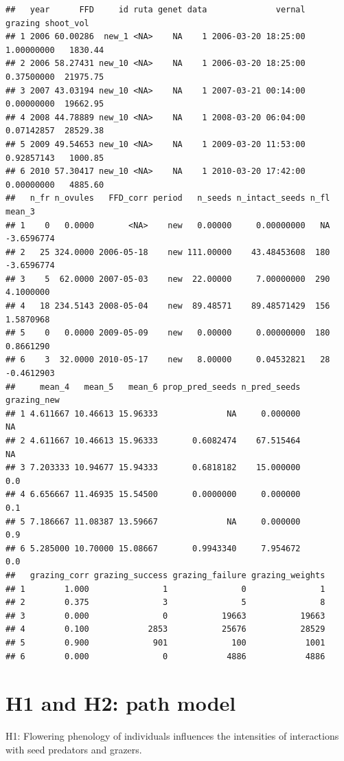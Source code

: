 \documentclass[
]{article}
\begin{document}
\begin{verbatim}
##   year      FFD     id ruta genet data              vernal    grazing shoot_vol
## 1 2006 60.00286  new_1 <NA>    NA    1 2006-03-20 18:25:00 1.00000000   1830.44
## 2 2006 58.27431 new_10 <NA>    NA    1 2006-03-20 18:25:00 0.37500000  21975.75
## 3 2007 43.03194 new_10 <NA>    NA    1 2007-03-21 00:14:00 0.00000000  19662.95
## 4 2008 44.78889 new_10 <NA>    NA    1 2008-03-20 06:04:00 0.07142857  28529.38
## 5 2009 49.54653 new_10 <NA>    NA    1 2009-03-20 11:53:00 0.92857143   1000.85
## 6 2010 57.30417 new_10 <NA>    NA    1 2010-03-20 17:42:00 0.00000000   4885.60
##   n_fr n_ovules   FFD_corr period   n_seeds n_intact_seeds n_fl     mean_3
## 1    0   0.0000       <NA>    new   0.00000     0.00000000   NA -3.6596774
## 2   25 324.0000 2006-05-18    new 111.00000    43.48453608  180 -3.6596774
## 3    5  62.0000 2007-05-03    new  22.00000     7.00000000  290  4.1000000
## 4   18 234.5143 2008-05-04    new  89.48571    89.48571429  156  1.5870968
## 5    0   0.0000 2009-05-09    new   0.00000     0.00000000  180  0.8661290
## 6    3  32.0000 2010-05-17    new   8.00000     0.04532821   28 -0.4612903
##     mean_4   mean_5   mean_6 prop_pred_seeds n_pred_seeds grazing_new
## 1 4.611667 10.46613 15.96333              NA     0.000000          NA
## 2 4.611667 10.46613 15.96333       0.6082474    67.515464          NA
## 3 7.203333 10.94677 15.94333       0.6818182    15.000000         0.0
## 4 6.656667 11.46935 15.54500       0.0000000     0.000000         0.1
## 5 7.186667 11.08387 13.59667              NA     0.000000         0.9
## 6 5.285000 10.70000 15.08667       0.9943340     7.954672         0.0
##   grazing_corr grazing_success grazing_failure grazing_weights
## 1        1.000               1               0               1
## 2        0.375               3               5               8
## 3        0.000               0           19663           19663
## 4        0.100            2853           25676           28529
## 5        0.900             901             100            1001
## 6        0.000               0            4886            4886
\end{verbatim}

\hypertarget{h1-and-h2-path-model}{%
\section{H1 and H2: path model}\label{h1-and-h2-path-model}}

H1: Flowering phenology of individuals influences the intensities of
interactions with seed predators and grazers.
\end{document}
